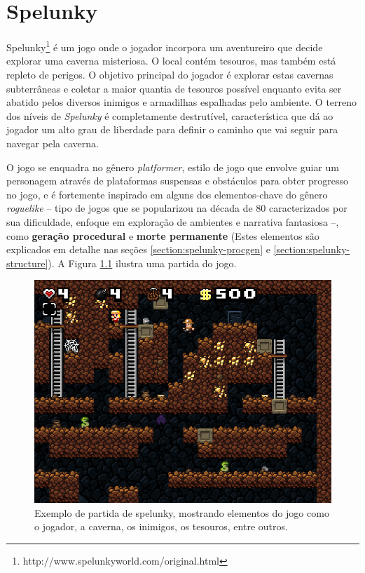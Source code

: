 \chapter{\label{chap:spelunky}Spelunky}
Spelunky\footnote{http://www.spelunkyworld.com/original.html} é um jogo onde o
jogador incorpora um aventureiro que decide explorar uma caverna misteriosa. O
local contém tesouros, mas também está repleto de perigos. O objetivo principal
do jogador é explorar estas cavernas subterrâneas e coletar a maior quantia de
tesouros possível enquanto evita ser abatido pelos diversos inimigos e
armadilhas espalhadas pelo ambiente. O terreno dos níveis de \textit{Spelunky}
é completamente destrutível, característica que dá ao jogador um alto grau de
liberdade para definir o caminho que vai seguir para navegar pela caverna.

O jogo se enquadra no gênero \textit{platformer}, estilo de jogo que envolve
guiar um personagem através de plataformas suspensas e obstáculos para obter
progresso no jogo, e é fortemente inspirado em alguns dos elementos-chave do
gênero \textit{roguelike} -- tipo de jogos que se popularizou na década de 80
caracterizados por sua dificuldade, enfoque em exploração de ambientes e
narrativa fantasiosa --, como \textbf{geração procedural} e \textbf{morte
permanente} (Estes elementos são explicados em detalhe nas seções
\ref{section:spelunky-procgen} e \ref{section:spelunky-structure}). A Figura
\ref{fig:spelunky-gameplay} ilustra uma partida do jogo.

\begin{figure}[htb!]
\centering
\includegraphics[width=.65\textwidth]{fig/spelunky-pc-screen.png}
\caption{\label{fig:spelunky-gameplay}Exemplo de partida de spelunky, mostrando
elementos do jogo como o jogador, a caverna, os inimigos, os tesouros, entre
outros.}
\end{figure}



